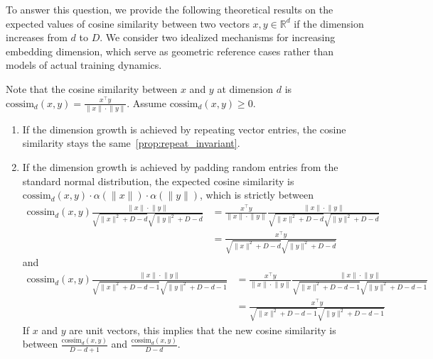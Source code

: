 \documentclass{article}
\theoremstyle{plain}
\theoremstyle{definition}
\theoremstyle{remark}
\begin{document}
\begin{appendices}
To answer this question, we provide the following theoretical results on the expected values of cosine similarity between two vectors $x, y \in \mathbb{R}^d$ if the dimension increases from $d$ to $D$. We consider two idealized mechanisms for increasing embedding dimension, which serve as geometric reference cases rather than models of actual training dynamics.

Note that the cosine similarity between $x$ and $y$ at dimension $d$ is $\mathrm{cossim}_d(x,y) = \frac{x^\top y}{\lVert x \rVert \cdot \lVert y \rVert}$. Assume $\mathrm{cossim}_d(x,y) \geq 0$.
\begin{enumerate}
    \item If the dimension growth is achieved by repeating vector entries, the cosine similarity stays the same~\ref{prop:repeat_invariant}.
    \item If the dimension growth is achieved by padding random entries from the standard normal distribution, the expected cosine similarity is $\mathrm{cossim}_d(x,y) \cdot \alpha(\lVert x \rVert) \cdot \alpha(\lVert y \rVert)$, which is strictly between
    \begin{align}
    \nonumber
    \mathrm{cossim}_d(x,y) \frac{\lVert x \rVert \cdot \lVert y \rVert}{\sqrt{\lVert x \rVert^2 + D-d}\sqrt{\lVert y \rVert^2 + D-d}}
    &= \frac{x^\top y}{\lVert x \rVert \cdot \lVert y \rVert} \frac{\lVert x \rVert \cdot \lVert y \rVert}{\sqrt{\lVert x \rVert^2 + D-d}\sqrt{\lVert y \rVert^2 + D-d}}\\
    \nonumber
    &= \frac{x^\top y}{\sqrt{\lVert x \rVert^2 + D-d}\sqrt{\lVert y \rVert^2 + D-d}}
    \end{align}
    and
    \begin{align}
    \nonumber
    \mathrm{cossim}_d(x,y) \frac{\lVert x \rVert \cdot \lVert y \rVert}{\sqrt{\lVert x \rVert^2 + D-d-1}\sqrt{\lVert y \rVert^2 + D-d-1}} 
    &= \frac{x^\top y}{\lVert x \rVert \cdot \lVert y \rVert} \frac{\lVert x \rVert \cdot \lVert y \rVert}{\sqrt{\lVert x \rVert^2 + D-d-1}\sqrt{\lVert y \rVert^2 + D-d-1}}\\
    \nonumber
    & = \frac{x^\top y}{\sqrt{\lVert x \rVert^2 + D-d-1}\sqrt{\lVert y \rVert^2 + D-d-1}}
    \end{align}
    If $x$ and $y$ are unit vectors, this implies that the new cosine similarity is between $\frac{\mathrm{cossim}_d(x,y)}{D - d + 1}$ and $\frac{\mathrm{cossim}_d(x,y)}{D - d}$.
\end{enumerate}


\end{appendices}
\end{document}
